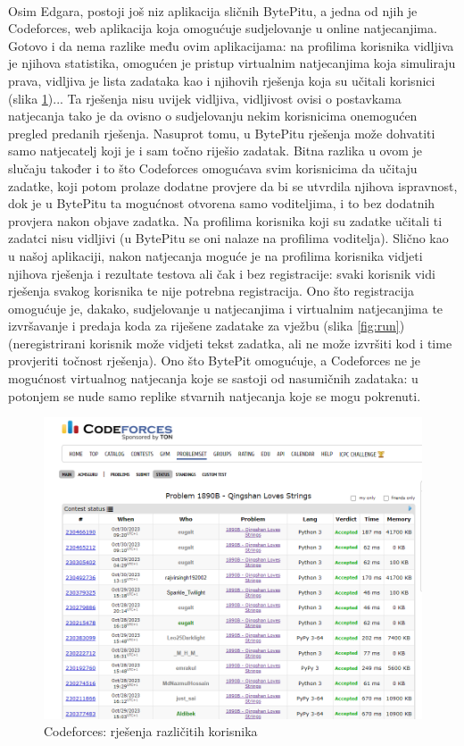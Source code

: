 		\noindent\\
			Osim Edgara, postoji još niz aplikacija sličnih BytePitu, a jedna od njih je Codeforces, web aplikacija koja omogućuje sudjelovanje u online natjecanjima. Gotovo i da nema razlike među ovim aplikacijama: na profilima korisnika vidljiva je njihova statistika, omogućen je pristup virtualnim natjecanjima koja simuliraju prava, vidljiva je lista zadataka kao i njihovih rješenja koja su učitali korisnici (slika \ref{fig:problemi})... Ta rješenja nisu uvijek vidljiva, vidljivost ovisi o postavkama natjecanja tako je da ovisno o sudjelovanju nekim korisnicima onemogućen pregled predanih rješenja. Nasuprot tomu, u BytePitu rješenja može dohvatiti samo natjecatelj koji je i sam točno riješio zadatak. Bitna razlika u ovom je slučaju također i to što Codeforces omogućava svim korisnicima da učitaju zadatke, koji potom prolaze dodatne provjere da bi se utvrdila njihova ispravnost, dok je u BytePitu ta mogućnost otvorena samo voditeljima, i to bez dodatnih provjera nakon objave zadatka. Na profilima korisnika koji su zadatke učitali ti zadatci nisu vidljivi (u BytePitu se oni nalaze na profilima voditelja).
		Slično kao u našoj aplikaciji, nakon natjecanja moguće je na profilima korisnika vidjeti njihova rješenja i rezultate testova ali čak i bez registracije: svaki korisnik vidi rješenja svakog korisnika te nije potrebna registracija. Ono što registracija omogućuje je, dakako, sudjelovanje u natjecanjima i virtualnim natjecanjima te izvršavanje i predaja koda za riješene zadatake za vježbu (slika \ref{fig:run}) (neregistrirani korisnik može vidjeti tekst zadatka, ali ne može izvršiti kod i time provjeriti točnost rješenja). Ono što BytePit omogućuje, a Codeforces ne je mogućnost virtualnog natjecanja koje se sastoji od nasumičnih zadataka: u potonjem se nude samo replike stvarnih natjecanja koje se mogu pokrenuti. \\
		
			\begin{figure}[H]
			\includegraphics[scale=0.4]{slike/cf1}
			\centering
			\caption{Codeforces: rješenja različitih korisnika}
			\label{fig:problemi}
		\end{figure}
		
